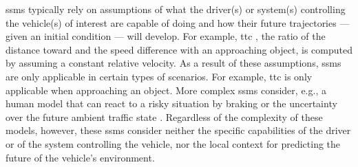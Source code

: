 \cstartb \Acp{ssm} typically rely on assumptions of what the driver(s) or system(s) controlling the vehicle(s) of interest are capable of doing and how their future trajectories --- given an initial condition --- will develop. 
For example, \ac{ttc} \autocite{hayward1972near}, the ratio of the distance toward and the speed difference with an approaching object, is computed by assuming a constant relative velocity. 
As a result of these assumptions, \acp{ssm} are only applicable in certain types of scenarios.
For example, \ac{ttc} is only applicable when approaching an object. \cendb
More complex \acp{ssm} consider, e.g., a human model that can react to a risky situation by braking \autocite{wang2014evaluation} or the uncertainty over the future ambient traffic state \autocite{mullakkal2020probabilistic}.
Regardless of the complexity of these models, however, these \acp{ssm} consider neither the specific capabilities of the driver or of the system controlling the vehicle, nor the local context for predicting the future of the vehicle's environment.  

